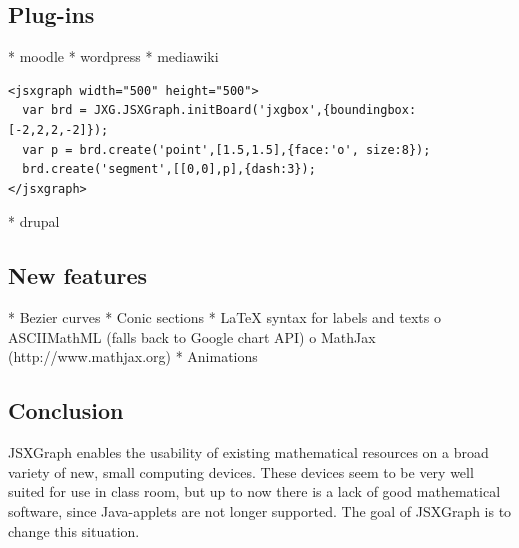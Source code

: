 \documentclass[12pt,a4paper]{article}%
\begin{document}
\subsection{Plug-ins}
    * moodle
    * wordpress
    * mediawiki
\begin{verbatim}
<jsxgraph width="500" height="500">
  var brd = JXG.JSXGraph.initBoard('jxgbox',{boundingbox:[-2,2,2,-2]});
  var p = brd.create('point',[1.5,1.5],{face:'o', size:8});
  brd.create('segment',[[0,0],p],{dash:3});
</jsxgraph>
\end{verbatim}                    
    * drupal 

\subsection{New features}
    * Bezier curves
    * Conic sections
    * \LaTeX{} syntax for labels and texts
          o ASCIIMathML (falls back to Google chart API)
          o MathJax (http://www.mathjax.org)
    * Animations

\subsection{Conclusion}
JSXGraph enables the usability of existing mathematical resources on a broad variety of new, small computing devices. These devices seem to be very well suited for use in class room, but up to now there is a lack of good mathematical software, since Java-applets are not longer supported. The goal of JSXGraph is to change this situation.
\end{document}
